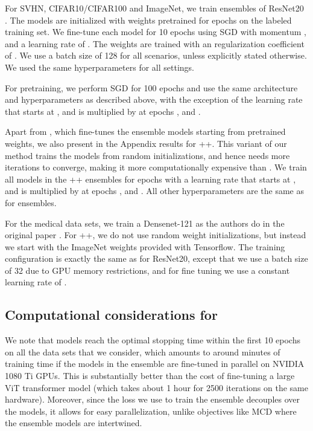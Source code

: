 For SVHN, CIFAR10/CIFAR100 and ImageNet, we train ensembles of ResNet20
\citep{He2015}. The models are initialized with weights pretrained for 
epochs on the labeled training set. We fine-tune each model for 10 epochs using
SGD with momentum , and a learning rate of .  The weights are
trained with an  regularization coefficient of .  We use a batch
size of 128 for all scenarios, unless explicitly stated otherwise. We used the
same hyperparameters for all settings. 

For pretraining, we perform SGD for 100 epochs and use the same architecture and
hyperparameters as described above, with the exception of the learning rate that
starts at , and is multiplied by  at epochs ,  and .

Apart from , which fine-tunes the ensemble models starting from
pretrained weights, we also present in the Appendix results for ++.
This variant of our method trains the models from random initializations, and
hence needs more iterations to converge, making it more computationally
expensive than . We train all models in the ++ ensembles for
 epochs with a learning rate that starts at , and is multiplied by
 at epochs ,  and . All other hyperparameters are the same as
for  ensembles.

For the medical data sets, we train a Densenet-121 as the authors do in the
original paper \citep{Cao2020}. For ++, we do not use random weight
initializations, but instead we start with the ImageNet weights provided with
Tensorflow. The training configuration is exactly the same as for ResNet20,
except that we use a batch size of 32 due to GPU memory restrictions, and for
fine tuning we use a constant learning rate of .

\vspace{-0.2cm}
\subsection{Computational considerations for }

We note that  models reach the optimal stopping time within the first
10 epochs on all the data sets that we consider, which amounts to around 
minutes of training time 
if the models in the ensemble are fine-tuned in parallel on NVIDIA 1080 Ti GPUs.
This is substantially better than the cost of fine-tuning a large ViT
transformer model (which takes about 1 hour for 2500 iterations on the same
hardware). Moreover, since the loss we use to train the ensemble decouples over
the models, it allows for easy parallelization, unlike objectives like MCD where
the ensemble models are intertwined.





